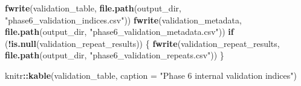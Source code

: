 \documentclass[
]{article}
\newenvironment{Shaded}{\begin{snugshade}}{\end{snugshade}}
\newcommand{\AttributeTok}[1]{\textcolor[rgb]{0.13,0.29,0.53}{#1}}
\newcommand{\ControlFlowTok}[1]{\textcolor[rgb]{0.13,0.29,0.53}{\textbf{#1}}}
\newcommand{\FunctionTok}[1]{\textcolor[rgb]{0.13,0.29,0.53}{\textbf{#1}}}
\newcommand{\NormalTok}[1]{#1}
\newcommand{\SpecialCharTok}[1]{\textcolor[rgb]{0.81,0.36,0.00}{\textbf{#1}}}
\newcommand{\StringTok}[1]{\textcolor[rgb]{0.31,0.60,0.02}{#1}}
\begin{document}
\begin{Shaded}
\begin{Highlighting}[]
\FunctionTok{fwrite}\NormalTok{(validation\_table, }\FunctionTok{file.path}\NormalTok{(output\_dir, }\StringTok{"phase6\_validation\_indices.csv"}\NormalTok{))}
\FunctionTok{fwrite}\NormalTok{(validation\_metadata, }\FunctionTok{file.path}\NormalTok{(output\_dir, }\StringTok{"phase6\_validation\_metadata.csv"}\NormalTok{))}
\ControlFlowTok{if}\NormalTok{ (}\SpecialCharTok{!}\FunctionTok{is.null}\NormalTok{(validation\_repeat\_results)) \{}
  \FunctionTok{fwrite}\NormalTok{(validation\_repeat\_results, }\FunctionTok{file.path}\NormalTok{(output\_dir, }\StringTok{"phase6\_validation\_repeats.csv"}\NormalTok{))}
\NormalTok{\}}

\NormalTok{knitr}\SpecialCharTok{::}\FunctionTok{kable}\NormalTok{(validation\_table, }\AttributeTok{caption =} \StringTok{"Phase 6 internal validation indices"}\NormalTok{)}
\end{Highlighting}
\end{Shaded}
\end{document}
